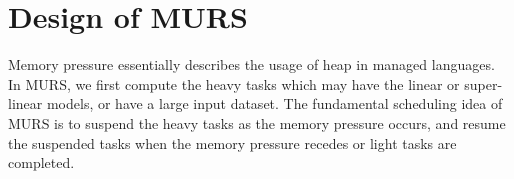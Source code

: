 \section{Design of MURS}
\label{sec:desgin}

Memory pressure essentially describes the usage of heap in managed languages. In MURS, we first compute the heavy tasks which may have the linear or super-linear models, or have a large input dataset. The fundamental scheduling idea of MURS is to suspend the heavy tasks as the memory pressure occurs, and resume the suspended tasks when the memory pressure recedes or light tasks are completed.






